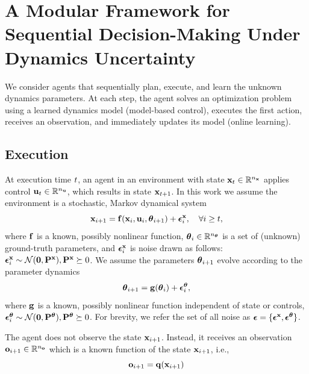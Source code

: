 \section{A Modular Framework for Sequential Decision-Making Under Dynamics Uncertainty}
\label{sec:contribution1}

We consider agents that sequentially plan, execute, and learn the unknown dynamics parameters.
At each step, the agent solves an optimization problem using a learned dynamics model (model-based control), executes the first action, receives an observation, and immediately updates its model (online learning).

\subsection{Execution}

At execution time $t$, an agent in an environment with state $\mathbf{x}_{t} \in \mathbb{R}^{n_{\mathbf{x}}}$ applies control $\mathbf{u}_t \in \mathbb{R}^{n_{\mathbf{u}}}$, which results in state $\mathbf{x}_{t+1}$.
In this work we assume the environment is a stochastic, Markov dynamical system
\begin{equation}
\label{eq:dynamical_system}
    \mathbf{x}_{i+1} = \mathbf{f}(\mathbf{x}_i, \mathbf{u}_i, \boldsymbol{\theta}_{i+1}) + \boldsymbol{\epsilon}^{\mathbf{x}}_i, \quad \forall i \ge t,
\end{equation}
where $\mathbf{f}$ is a known, possibly nonlinear function, $\boldsymbol{\theta}_i \in \mathbb{R}^{n_{\boldsymbol{\theta}}}$ is a set of (unknown) ground-truth parameters, and $\boldsymbol{\epsilon}^{\mathbf{x}}_i$ is noise drawn as follows: $\boldsymbol{\epsilon}^{\mathbf{x}}_i \sim \mathcal{N}(\mathbf{0}, \mathbf{P}^{\mathbf{x}}), \mathbf{P}^{\mathbf{x}} \succeq 0$.
We assume the parameters $\boldsymbol{\theta}_{i+1}$ evolve according to the parameter dynamics
\begin{equation}
    \label{eq:process_model}
    \boldsymbol{\theta}_{i+1} = \mathbf{g}(\boldsymbol{\theta}_{i}) + \boldsymbol{\epsilon}^{\boldsymbol{\theta}}_{i}, 
\end{equation}
where $\mathbf{g}$ is a known, possibly nonlinear function independent of state or controls, $\boldsymbol{\epsilon}^{\boldsymbol{\theta}}_i \sim \mathcal{N}(\mathbf{0}, \mathbf{P}^{\boldsymbol{\theta}}), \mathbf{P}^{\boldsymbol{\theta}} \succeq 0$.
For brevity, we refer the set of all noise as $\boldsymbol{\epsilon} = \{\boldsymbol{\epsilon}^{\mathbf{x}}, \boldsymbol{\epsilon}^{\boldsymbol{\theta}}\}$.

The agent does not observe the state $\mathbf{x}_{i+1}$. 
Instead, it receives an observation $\mathbf{o}_{i+1} \in \mathbb{R}^{n_{\mathbf{o}}}$ which is a known function of the state $\mathbf{x}_{i+1}$, i.e., 
\begin{equation}
    \mathbf{o}_{i+1} = \mathbf{q}(\mathbf{x}_{i+1})
\end{equation}

